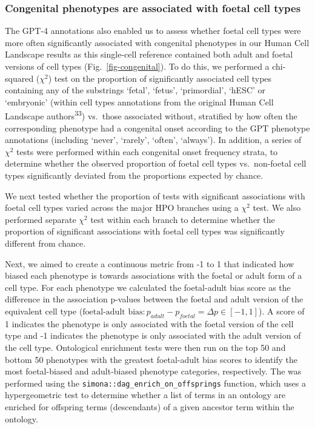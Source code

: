 \documentclass[
]{article}
\begin{document}
\subsubsection{Congenital phenotypes are associated with foetal cell
types}\label{congenital-phenotypes-are-associated-with-foetal-cell-types-1}

The GPT-4 annotations also enabled us to assess whether foetal cell
types were more often significantly associated with congenital
phenotypes in our Human Cell Landscape results as this single-cell
reference contained both adult and foetal versions of cell types
(Fig.~\ref{fig-congenital}). To do this, we performed a chi-squared
(\(\chi^2\)) test on the proportion of significantly associated cell
types containing any of the substrings `fetal', `fetus', `primordial',
`hESC' or `embryonic' (within cell types annotations from the original
Human Cell Landscape authors\textsuperscript{33}) vs.~those associated
without, stratified by how often the corresponding phenotype had a
congenital onset according to the GPT phenotype annotations (including
`never', `rarely', `often', `always'). In addition, a series of
\(\chi^2\) tests were performed within each congenital onset frequency
strata, to determine whether the observed proportion of foetal cell
types vs.~non-foetal cell types significantly deviated from the
proportions expected by chance.

We next tested whether the proportion of tests with significant
associations with foetal cell types varied across the major HPO branches
using a \(\chi^2\) test. We also performed separate \(\chi^2\) test
within each branch to determine whether the proportion of significant
associations with foetal cell types was significantly different from
chance.

Next, we aimed to create a continuous metric from -1 to 1 that indicated
how biased each phenotype is towards associations with the foetal or
adult form of a cell type. For each phenotype we calculated the
foetal-adult bias score as the difference in the association p-values
between the foetal and adult version of the equivalent cell type
(\(\text{foetal-adult bias}: p_{adult} - p_{foetal} = \Delta p \in [-1,1]\)).
A score of 1 indicates the phenotype is only associated with the foetal
version of the cell type and -1 indicates the phenotype is only
associated with the adult version of the cell type. Ontological
enrichment tests were then run on the top 50 and bottom 50 phenotypes
with the greatest foetal-adult bias scores to identify the most
foetal-biased and adult-biased phenotype categories, respectively. The
was performed using the \texttt{simona::dag\_enrich\_on\_offsprings}
function, which uses a hypergeometric test to determine whether a list
of terms in an ontology are enriched for offspring terms (descendants)
of a given ancestor term within the ontology.
\end{document}
